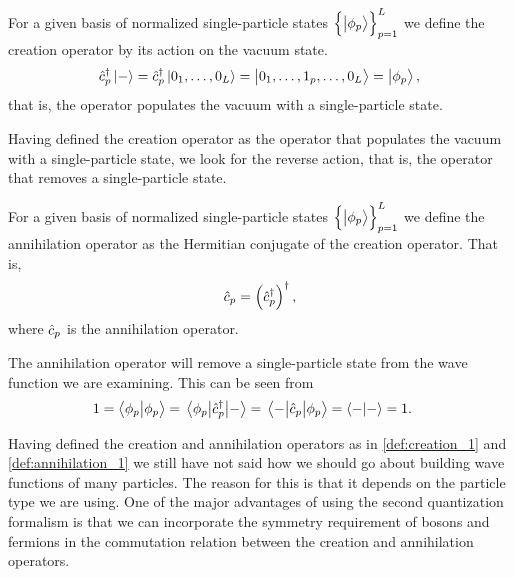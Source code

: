             \begin{definition}
                \label{def:creation_1}
                For a given basis of normalized single-particle states
                $\left\{ \ket{\phi_p} \right\}_{p = 1}^{L}$ we define the creation
                operator by its action on the vacuum state.
                \begin{align}
                    \hat{c}_{p}^{\dagger}\ket{-}
                    = \hat{c}_{p}^{\dagger}\ket{0_1, \dots, 0_L}
                    = \ket{0_1, \dots, 1_p, \dots, 0_L}
                    = \ket{\phi_p},
                \end{align}
                that is, the operator populates the vacuum with a
                single-particle state.
            \end{definition}
            Having defined the creation operator as the operator that populates
            the vacuum with a single-particle state, we look for the reverse
            action, that is, the operator that removes a single-particle state.

            \begin{definition}
                \label{def:annihilation_1}
                For a given basis of normalized single-particle states
                $\left\{ \ket{\phi_p} \right\}_{p = 1}^{L}$ we define the annihilation
                operator as the Hermitian conjugate of the creation operator.
                That is,
                \begin{align}
                    \hat{c}_{p} = \left( \hat{c}_{p}^{\dagger} \right)^{\dagger},
                \end{align}
                where $\hat{c}_{p}$ is the annihilation operator.
            \end{definition}
            The annihilation operator will remove a single-particle state from
            the wave function we are examining.
            This can be seen from
            \begin{align}
                1 &= \braket{\phi_p}
                = \mel{\phi_p}{\hat{c}_{p}^{\dagger}}{-}
                = \mel{-}{\hat{c}_{p}}{\phi_p}
                = \braket{-}
                = 1.
            \end{align}

            Having defined the creation and annihilation operators as in
            \autoref{def:creation_1} and \autoref{def:annihilation_1} we still
            have not said how we should go about building wave functions of many
            particles.
            The reason for this is that it depends on the particle type we are
            using.
            One of the major advantages of using the second quantization
            formalism is that we can incorporate the symmetry requirement of
            bosons and fermions in the commutation relation between the creation
            and annihilation operators.


